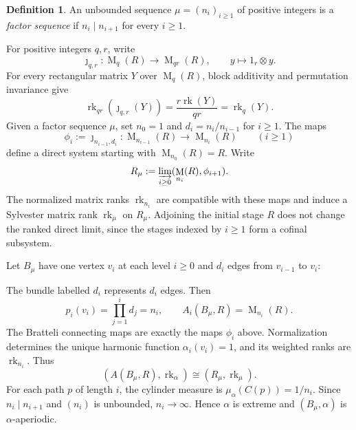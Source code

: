 \documentclass[11pt]{amsart}
\DeclareMathOperator{\rk}{rk}
\DeclareMathOperator{\Mat}{M}
\theoremstyle{definition}
\newtheorem{definition}[theorem]{Definition}
\theoremstyle{remark}
\begin{document}
\begin{definition}\label{def:factor-sequence}
An unbounded sequence $\mu=(n_i)_{i\geq1}$ of positive integers is a
\emph{factor sequence} if $n_i\mid n_{i+1}$ for every $i\geq1$.
\end{definition}

For positive integers $q,r$, write
\[
 \jmath_{q,r}\colon\Mat_q(R)\longrightarrow\Mat_{qr}(R),
 \qquad y\longmapsto1_r\otimes y.
\]
For every rectangular matrix $Y$ over $\Mat_q(R)$, block additivity
and permutation invariance give
\[
 \rk_{qr}(\jmath_{q,r}(Y))
 =\frac{r\rk(Y)}{qr}=\rk_q(Y).
\]
Given a factor sequence $\mu$, set $n_0=1$ and
$d_i=n_i/n_{i-1}$ for $i\geq1$.  The maps
\[
 \phi_i:=\jmath_{n_{i-1},d_i}\colon
 \Mat_{n_{i-1}}(R)\longrightarrow\Mat_{n_i}(R)
 \qquad(i\geq1)
\]
define a direct system starting with $\Mat_{n_0}(R)=R$.
Write
\[
 R_\mu:=\varinjlim_{i\geq0}(\Mat_{n_i}(R),\phi_{i+1}).
\]
The normalized matrix ranks $\rk_{n_i}$ are compatible with these maps
and induce a Sylvester matrix rank $\rk_\mu$ on $R_\mu$.
Adjoining the initial stage $R$ does not change the ranked direct limit,
since the stages indexed by $i\geq1$ form a cofinal subsystem.

Let $B_\mu$ have one vertex $v_i$ at each level $i\geq0$ and $d_i$ edges
from $v_{i-1}$ to $v_i$:
\begin{center}
\end{center}
The bundle labelled $d_i$ represents $d_i$ edges.  Then
\[
 p_i(v_i)=\prod_{j=1}^i d_j=n_i,
 \qquad A_i(B_\mu,R)=\Mat_{n_i}(R).
\]
The Bratteli connecting maps are exactly the maps $\phi_i$ above.
Normalization determines the unique harmonic function
$\alpha_i(v_i)=1$, and its weighted ranks are $\rk_{n_i}$.
Thus
\[
 (A(B_\mu,R),\rk_\alpha)\cong(R_\mu,\rk_\mu).
\]
For each path $p$ of length $i$, the cylinder measure is
$\mu_\alpha(C(p))=1/n_i$.
Since $n_i\mid n_{i+1}$ and $(n_i)$ is unbounded, $n_i\to\infty$.
Hence $\alpha$ is extreme and $(B_\mu,\alpha)$ is $\alpha$-aperiodic.
\end{document}
